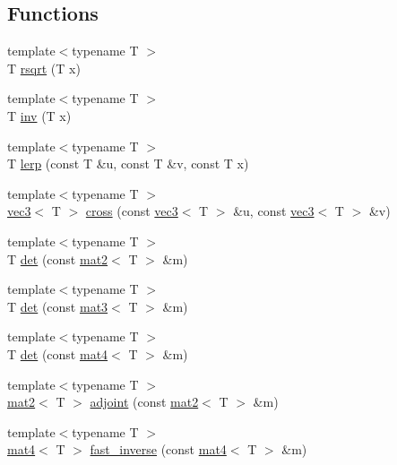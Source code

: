 \subsection*{Functions}
\begin{DoxyCompactItemize}
\item 
{\footnotesize template$<$typename T $>$ }\\T \hyperlink{namespacevmath_a9a22bf39ff602507bf9382dae93a7bf2}{rsqrt} (T x)
\item 
{\footnotesize template$<$typename T $>$ }\\T \hyperlink{namespacevmath_a1c38199e02bd5d10bc075f11dabb9f0d}{inv} (T x)
\item 
{\footnotesize template$<$typename T $>$ }\\T \hyperlink{namespacevmath_a6dfd64dcd69f95ceadd0bd6e7e319299}{lerp} (const T \&u, const T \&v, const T x)
\item 
{\footnotesize template$<$typename T $>$ }\\\hyperlink{structvmath_1_1vec3}{vec3}$<$ T $>$ \hyperlink{namespacevmath_a799e9d57fe318fdeb6db997b6ef1143f}{cross} (const \hyperlink{structvmath_1_1vec3}{vec3}$<$ T $>$ \&u, const \hyperlink{structvmath_1_1vec3}{vec3}$<$ T $>$ \&v)
\item 
{\footnotesize template$<$typename T $>$ }\\T \hyperlink{namespacevmath_afee7905e51490be5bcfecb4380ee27ca}{det} (const \hyperlink{structvmath_1_1mat2}{mat2}$<$ T $>$ \&m)
\item 
{\footnotesize template$<$typename T $>$ }\\T \hyperlink{namespacevmath_a4a73020a0ac374b4e7182f70f51cf495}{det} (const \hyperlink{structvmath_1_1mat3}{mat3}$<$ T $>$ \&m)
\item 
{\footnotesize template$<$typename T $>$ }\\T \hyperlink{namespacevmath_a27bdfe677f6477bf875e3543d5997873}{det} (const \hyperlink{structvmath_1_1mat4}{mat4}$<$ T $>$ \&m)
\item 
{\footnotesize template$<$typename T $>$ }\\\hyperlink{structvmath_1_1mat2}{mat2}$<$ T $>$ \hyperlink{namespacevmath_a125f0c95da37ed355720f8b8b763d4f3}{adjoint} (const \hyperlink{structvmath_1_1mat2}{mat2}$<$ T $>$ \&m)
\item 
{\footnotesize template$<$typename T $>$ }\\\hyperlink{structvmath_1_1mat4}{mat4}$<$ T $>$ \hyperlink{namespacevmath_a07c03df5bb5d3d2b397af59d3c102a83}{fast\-\_\-inverse} (const \hyperlink{structvmath_1_1mat4}{mat4}$<$ T $>$ \&m)

\end{DoxyCompactItemize}
